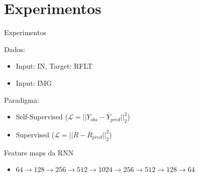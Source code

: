 \section{Experimentos}

\begin{frame}{Experimentos}

    Dados:
    \begin{itemize}
        \item Input: IN, Target: RFLT
        \item Input: IMG
    \end{itemize}

    Paradigma:
    \begin{itemize}
        \item Self-Supervised ($\mathcal{L} = || Y_{obs} - \bar{Y}_{pred} ||_2^2$)
        \item Supervised ($\mathcal{L} = || R - \bar{R}_{pred} ||_2^2$)
    \end{itemize}

    Feature maps da RNN
    \begin{itemize}
        \item $64 \rightarrow 128 \rightarrow 256 \rightarrow 512 \rightarrow 1024 \rightarrow 256 \rightarrow 512 \rightarrow 128 \rightarrow 64$
    \end{itemize}
    
\end{frame}